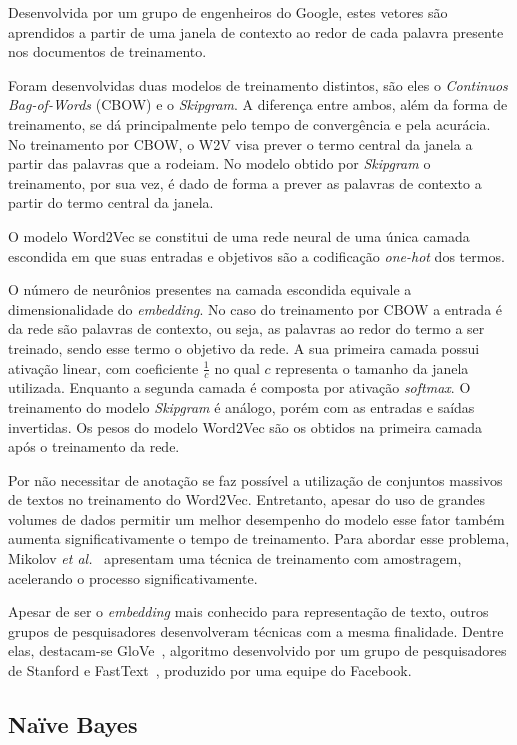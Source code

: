 Desenvolvida por um grupo de engenheiros do Google, estes vetores são aprendidos a partir de uma janela de contexto
ao redor de cada palavra presente nos documentos de treinamento.

Foram desenvolvidas duas modelos de treinamento distintos, são eles o \textit{Continuos Bag-of-Words} (CBOW) e o
\textit{Skipgram}.
A diferença entre ambos, além da forma de treinamento, se dá principalmente pelo tempo de convergência e pela acurácia.
No treinamento por CBOW, o W2V visa prever o termo central da janela a partir das palavras que a rodeiam.
No modelo obtido por \textit{Skipgram} o treinamento, por sua vez, é dado de forma a prever as palavras de contexto a
partir do termo central da janela.

O modelo Word2Vec se constitui de uma rede neural de uma única camada escondida em que suas entradas e objetivos são a
codificação \textit{one-hot} dos termos.

O número de neurônios presentes na camada escondida equivale a dimensionalidade do \textit{embedding}.
No caso do treinamento por CBOW a entrada é da rede são palavras de contexto, ou seja, as palavras ao redor do termo a
ser treinado, sendo esse termo o objetivo da rede.
A sua primeira camada possui ativação linear, com coeficiente $\frac{1}{c}$ no qual $c$ representa o tamanho da janela
utilizada.
Enquanto a segunda camada é composta por ativação \textit{softmax}.
O treinamento do modelo \textit{Skipgram} é análogo, porém com as entradas e saídas invertidas.
Os pesos do modelo Word2Vec são os obtidos na primeira camada após o treinamento da rede.

Por não necessitar de anotação se faz possível a utilização de conjuntos massivos de textos no treinamento do Word2Vec.
Entretanto, apesar do uso de grandes volumes de dados permitir um melhor desempenho do modelo esse fator também aumenta
significativamente o tempo de treinamento.
Para abordar esse problema, Mikolov \textit{et al.}~\cite{mikolov13b} apresentam uma técnica de treinamento com
amostragem, acelerando o processo significativamente.

Apesar de ser o \textit{embedding} mais conhecido para representação de texto, outros grupos de pesquisadores
desenvolveram técnicas com a mesma finalidade.
Dentre elas, destacam-se GloVe~\cite{pennington14}, algoritmo desenvolvido por um grupo de pesquisadores de Stanford e
FastText~\cite{bojanowski16}, produzido por uma equipe do Facebook.

\subsection{Naïve Bayes}

